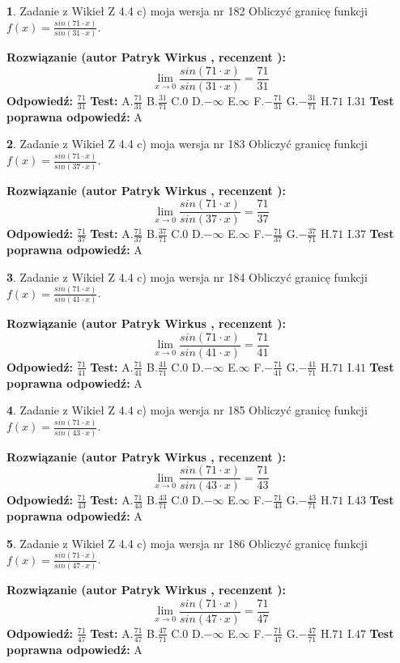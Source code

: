 \documentclass[12pt, a4paper]{article}
\theoremstyle{definition} %
\newtheorem{zad}{}
\newcommand{\zadStart}[1]{\begin{zad}#1\newline}
\newcommand{\zadStop}{\end{zad}}
\newcommand{\rozwStart}[2]{\noindent \textbf{Rozwiązanie (autor #1 , recenzent #2): }\newline}
\newcommand{\rozwStop}{\newline}
\newcommand{\odpStart}{\noindent \textbf{Odpowiedź:}\newline}
\newcommand{\odpStop}{\newline}
\newcommand{\testStart}{\noindent \textbf{Test:}\newline}
\newcommand{\testStop}{\newline}
\newcommand{\kluczStart}{\noindent \textbf{Test poprawna odpowiedź:}\newline}
\newcommand{\kluczStop}{\newline}
\begin{document}
\zadStart{Zadanie z Wikieł Z 4.4 c) moja wersja nr 182}
Obliczyć granicę funkcji $f(x)=\frac{sin(71\cdot x)}{sin(31\cdot x)}$.
\zadStop
\rozwStart{Patryk Wirkus}{}
$$\lim\limits_{x\to 0}\frac{sin(71\cdot x)}{sin(31\cdot x)}=
\frac{71}{31}$$
\rozwStop
\odpStart
$\frac{71}{31}$
\odpStop
\testStart
A.$\frac{71}{31}$
B.$\frac{31}{71}$
C.$0$
D.$-\infty$
E.$\infty$
F.$-\frac{71}{31}$
G.$-\frac{31}{71}$
H.$71$
I.$31$
\testStop
\kluczStart
A
\kluczStop



\zadStart{Zadanie z Wikieł Z 4.4 c) moja wersja nr 183}
Obliczyć granicę funkcji $f(x)=\frac{sin(71\cdot x)}{sin(37\cdot x)}$.
\zadStop
\rozwStart{Patryk Wirkus}{}
$$\lim\limits_{x\to 0}\frac{sin(71\cdot x)}{sin(37\cdot x)}=
\frac{71}{37}$$
\rozwStop
\odpStart
$\frac{71}{37}$
\odpStop
\testStart
A.$\frac{71}{37}$
B.$\frac{37}{71}$
C.$0$
D.$-\infty$
E.$\infty$
F.$-\frac{71}{37}$
G.$-\frac{37}{71}$
H.$71$
I.$37$
\testStop
\kluczStart
A
\kluczStop



\zadStart{Zadanie z Wikieł Z 4.4 c) moja wersja nr 184}
Obliczyć granicę funkcji $f(x)=\frac{sin(71\cdot x)}{sin(41\cdot x)}$.
\zadStop
\rozwStart{Patryk Wirkus}{}
$$\lim\limits_{x\to 0}\frac{sin(71\cdot x)}{sin(41\cdot x)}=
\frac{71}{41}$$
\rozwStop
\odpStart
$\frac{71}{41}$
\odpStop
\testStart
A.$\frac{71}{41}$
B.$\frac{41}{71}$
C.$0$
D.$-\infty$
E.$\infty$
F.$-\frac{71}{41}$
G.$-\frac{41}{71}$
H.$71$
I.$41$
\testStop
\kluczStart
A
\kluczStop



\zadStart{Zadanie z Wikieł Z 4.4 c) moja wersja nr 185}
Obliczyć granicę funkcji $f(x)=\frac{sin(71\cdot x)}{sin(43\cdot x)}$.
\zadStop
\rozwStart{Patryk Wirkus}{}
$$\lim\limits_{x\to 0}\frac{sin(71\cdot x)}{sin(43\cdot x)}=
\frac{71}{43}$$
\rozwStop
\odpStart
$\frac{71}{43}$
\odpStop
\testStart
A.$\frac{71}{43}$
B.$\frac{43}{71}$
C.$0$
D.$-\infty$
E.$\infty$
F.$-\frac{71}{43}$
G.$-\frac{43}{71}$
H.$71$
I.$43$
\testStop
\kluczStart
A
\kluczStop



\zadStart{Zadanie z Wikieł Z 4.4 c) moja wersja nr 186}
Obliczyć granicę funkcji $f(x)=\frac{sin(71\cdot x)}{sin(47\cdot x)}$.
\zadStop
\rozwStart{Patryk Wirkus}{}
$$\lim\limits_{x\to 0}\frac{sin(71\cdot x)}{sin(47\cdot x)}=
\frac{71}{47}$$
\rozwStop
\odpStart
$\frac{71}{47}$
\odpStop
\testStart
A.$\frac{71}{47}$
B.$\frac{47}{71}$
C.$0$
D.$-\infty$
E.$\infty$
F.$-\frac{71}{47}$
G.$-\frac{47}{71}$
H.$71$
I.$47$
\testStop
\kluczStart
A
\kluczStop
\end{document}
